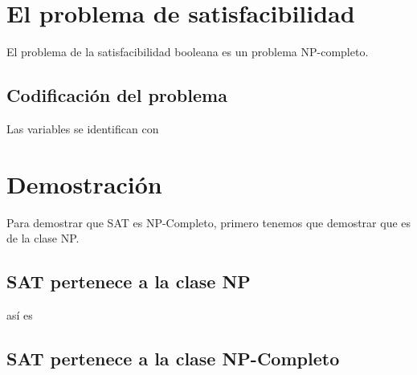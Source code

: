 \documentclass[a4paper]{article}
\begin{document}

\section{El problema de satisfacibilidad}
El problema de la satisfacibilidad booleana es un problema NP-completo\cite{cook1971complexity}.



\subsection{Codificación del problema}

Las variables se identifican con

\section{Demostración}
Para demostrar que SAT es NP-Completo, primero tenemos que demostrar que es de la clase NP.

\subsection{SAT pertenece a la clase NP}
así es

\subsection{SAT pertenece a la clase NP-Completo}





\nocite{*}


%
\end{document}
